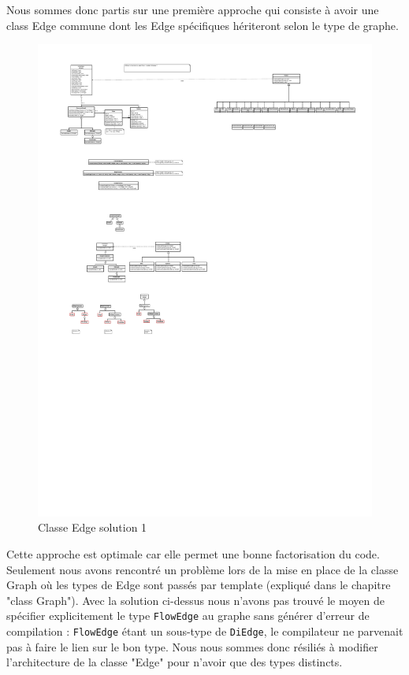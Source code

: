 \documentclass[french]{article}
\begin{document}
			Nous sommes donc partis sur une première approche qui consiste à avoir une class Edge commune dont les Edge spécifiques hériteront selon le type de graphe.
			\begin{figure}[H]
				\centering
				\includegraphics[scale=4.0]{Conception/graph/classedgesol1.pdf}
				\caption{Classe Edge solution 1}
			\end{figure}
			Cette approche est optimale car elle permet une bonne factorisation du code. Seulement nous avons rencontré un problème lors de la mise en place de la classe Graph où les types de Edge sont passés par template (expliqué dans le chapitre "class Graph"). Avec la solution ci-dessus nous n'avons pas trouvé le moyen de spécifier explicitement le type \lstinline[basicstyle=\ttfamily\color{blue}]|FlowEdge| au graphe sans générer d'erreur de compilation : \lstinline[basicstyle=\ttfamily\color{blue}]|FlowEdge| étant un sous-type de \lstinline[basicstyle=\ttfamily\color{blue}]|DiEdge|, le compilateur ne parvenait pas à faire le lien sur le bon type. Nous nous sommes donc résiliés à modifier l'architecture de la classe "Edge" pour n'avoir que des types distincts.
\end{document}
